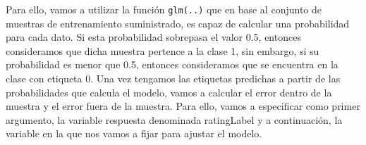 \documentclass[spanish,]{article}
\newenvironment{Shaded}{\begin{snugshade}}{\end{snugshade}}
\newcommand{\KeywordTok}[1]{\textcolor[rgb]{0.13,0.29,0.53}{\textbf{#1}}}
\newcommand{\DataTypeTok}[1]{\textcolor[rgb]{0.13,0.29,0.53}{#1}}
\newcommand{\DecValTok}[1]{\textcolor[rgb]{0.00,0.00,0.81}{#1}}
\newcommand{\FloatTok}[1]{\textcolor[rgb]{0.00,0.00,0.81}{#1}}
\newcommand{\StringTok}[1]{\textcolor[rgb]{0.31,0.60,0.02}{#1}}
\newcommand{\CommentTok}[1]{\textcolor[rgb]{0.56,0.35,0.01}{\textit{#1}}}
\newcommand{\ControlFlowTok}[1]{\textcolor[rgb]{0.13,0.29,0.53}{\textbf{#1}}}
\newcommand{\OperatorTok}[1]{\textcolor[rgb]{0.81,0.36,0.00}{\textbf{#1}}}
\newcommand{\NormalTok}[1]{#1}
\begin{document}
Para ello, vamos a utilizar la función \texttt{glm(..)} que en base al
conjunto de muestras de entrenamiento suministrado, es capaz de calcular
una probabilidad para cada dato. Si esta probabilidad sobrepasa el valor
0.5, entonces consideramos que dicha muestra pertence a la clase 1, sin
embargo, si su probabilidad es menor que 0.5, entonces consideramos que
se encuentra en la clase con etiqueta 0. Una vez tengamos las etiquetas
predichas a partir de las probabilidades que calcula el modelo, vamos a
calcular el error dentro de la muestra y el error fuera de la muestra.
Para ello, vamos a especificar como primer argumento, la variable
respuesta denominada ratingLabel y a continuación, la variable en la que
nos vamos a fijar para ajustar el modelo.

\begin{Shaded}
\end{Shaded}
\end{document}
